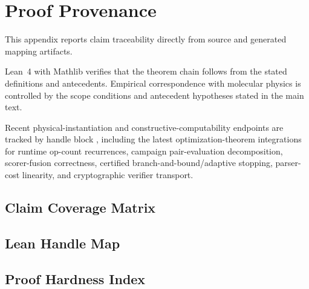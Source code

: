 \section{Proof Provenance}\label{appendix-lean}

This appendix reports claim traceability directly from source and generated mapping artifacts.

Lean~4 with Mathlib verifies that the theorem chain follows from the stated definitions and antecedents. Empirical correspondence with molecular physics is controlled by the scope conditions and antecedent hypotheses stated in the main text.

Recent physical-instantiation and constructive-computability endpoints are tracked by handle block , including the latest optimization-theorem integrations for runtime op-count recurrences, campaign pair-evaluation decomposition, scorer-fusion correctness, certified branch-and-bound/adaptive stopping, parser-cost linearity, and cryptographic verifier transport.

\subsection{Claim Coverage Matrix}



\subsection{Lean Handle Map}



\subsection{Proof Hardness Index}


